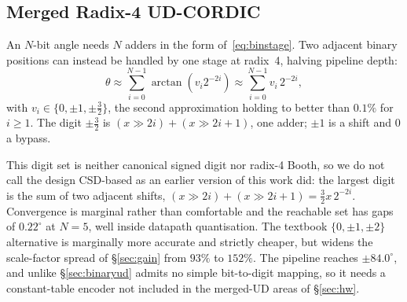 \documentclass[conference]{IEEEtran}
\begin{document}
%

\subsection{Merged Radix-4 UD-CORDIC}
\label{sec:merged}

An $N$-bit angle needs $N$ adders in the form of~\eqref{eq:binstage}. Two
adjacent binary positions can instead be handled by one stage at radix~4,
halving pipeline depth:
\begin{equation}
  \theta \approx \sum_{i=0}^{N-1} \arctan(v_i 2^{-2i})
         \approx \sum_{i=0}^{N-1} v_i\,2^{-2i},
  \label{eq:merged}
\end{equation}
with $v_i \in \{0, \pm 1, \pm \tfrac{3}{2}\}$,
the second approximation holding to better than $0.1\%$ for $i \ge 1$. The
digit $\pm\tfrac{3}{2}$ is $(x \gg 2i) + (x \gg 2i{+}1)$, one adder; $\pm 1$ is
a shift and $0$ a bypass.

This digit set is neither canonical signed digit nor radix-4 Booth, so we do
not call the design CSD-based as an earlier version of this work did: the
largest digit is the sum of two adjacent shifts,
$(x \gg 2i) + (x \gg 2i{+}1) = \tfrac{3}{2}x\,2^{-2i}$. Convergence is marginal
rather than comfortable and the reachable set has gaps of $0.22^{\circ}$ at
$N=5$, well inside datapath quantisation. The textbook $\{0,\pm 1,\pm 2\}$
alternative is marginally more accurate and strictly cheaper, but widens the
scale-factor spread of \S\ref{sec:gain} from $93\%$ to $152\%$. The pipeline
reaches $\pm 84.0^{\circ}$, and unlike \S\ref{sec:binaryud} admits no simple
bit-to-digit mapping, so it needs a constant-table encoder not included in the
merged-UD areas of \S\ref{sec:hw}.
\end{document}
